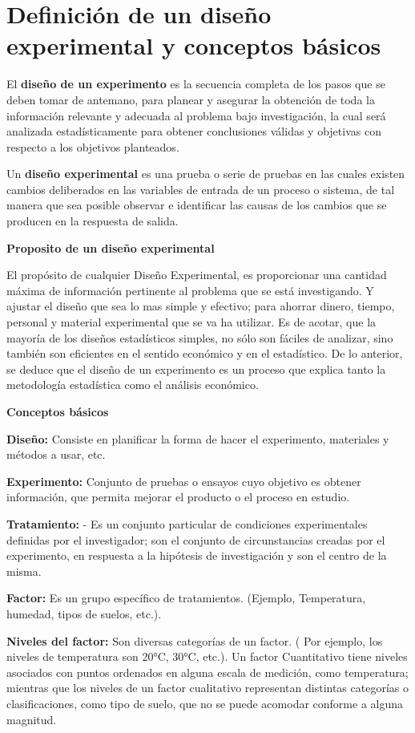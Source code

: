 \documentclass[12pt,letterpaper]{report}
\begin{document}
\chapter*{Definición de un diseño experimental y conceptos básicos}
El \textbf{diseño de un experimento} es la secuencia completa de los pasos que se deben
tomar de antemano, para planear y asegurar la obtención de toda la información relevante y
adecuada al problema bajo investigación, la cual será analizada estadísticamente para obtener
conclusiones válidas y objetivas con respecto a los objetivos planteados.

Un \textbf{diseño experimental} es una prueba o serie de pruebas en las cuales existen
cambios deliberados en las variables de entrada de un proceso o sistema, de tal manera que
sea posible observar e identificar las causas de los cambios que se producen en la respuesta de
salida.

\textbf{Proposito de un diseño experimental}

El propósito de cualquier Diseño Experimental, es proporcionar una cantidad máxima de
información pertinente al problema que se está investigando. Y ajustar el diseño que sea lo
mas simple y efectivo; para ahorrar dinero, tiempo, personal y material experimental que se va
ha utilizar. Es de acotar, que la mayoría de los diseños estadísticos simples, no sólo son fáciles
de analizar, sino también son eficientes en el sentido económico y en el estadístico.
De lo anterior, se deduce que el diseño de un experimento es un proceso que explica
tanto la metodología estadística como el análisis económico.

\textbf{Conceptos básicos}


\textbf{Diseño:} Consiste en planificar la forma de hacer el experimento, materiales y métodos a
usar, etc.

\textbf{Experimento:} Conjunto de pruebas o ensayos cuyo objetivo es obtener 
información, que permita mejorar el producto o el proceso en estudio.

\textbf{Tratamiento:}
- Es un conjunto particular de condiciones experimentales definidas por el investigador; son el conjunto de circunstancias creadas por el experimento, en respuesta a la hipótesis de investigación y son el centro de la misma.

\textbf{Factor:} Es un grupo específico de tratamientos. (Ejemplo, Temperatura, humedad, tipos
de suelos, etc.).

\textbf{Niveles del factor:} Son diversas categorías de un factor. ( Por ejemplo, los niveles
de temperatura son 20°C, 30°C, etc.). Un factor Cuantitativo tiene niveles
asociados con puntos ordenados en alguna escala de medición, como
temperatura; mientras que los niveles de un factor cualitativo representan
distintas categorías o clasificaciones, como tipo de suelo, que no se puede acomodar
conforme a alguna magnitud.
\end{document}
